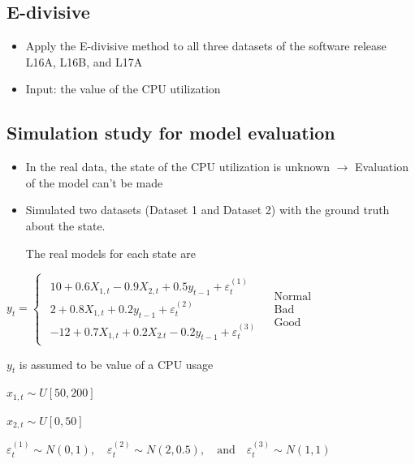 \documentclass{beamer}
\begin{document}
\subsection{E-divisive}
\begin{frame}

\begin{itemize}
\item Apply the E-divisive method to all three datasets of the software release L16A, L16B, and L17A
\item Input: the value of the CPU utilization
\end{itemize}

\end{frame}

\subsection{Simulation study for model evaluation}
\begin{frame}
\begin{itemize}
\item In the real data, the state of the CPU utilization is unknown $\rightarrow$ Evaluation of the model can't be made
\pause

\item Simulated two datasets (Dataset 1 and Dataset 2) with the ground truth about the state. 

The real models for each state are
\end{itemize}

$y_{t}=\begin{cases}
\begin{array}{c}
10+0.6X_{1,t}-0.9X{}_{2,t}+0.5y_{t-1}+\varepsilon_{t}^{(1)}\\
2+0.8X_{1,t}+0.2y_{t-1}+\varepsilon_{t}^{(2)}\\
-12+0.7X_{1,t}+0.2X{}_{2.t}-0.2y_{t-1}+\varepsilon_{t}^{(3)}
\end{array} & \begin{array}{c}
\mathrm{Normal}\\
\mathrm{Bad}\\
\mathrm{Good}
\end{array}\end{cases}$
\vspace{1em}

$y_{t}$ is assumed to be value of a CPU usage

$x_{1,t}\sim U[50,200]$

$x_{2,t}\sim U[0,50]$ 

$\varepsilon_{t}^{(1)}\sim N(0,1),\quad \varepsilon_{t}^{(2)}\sim N(2,0.5),\quad \mathrm{and} \quad \varepsilon_{t}^{(3)}\sim N(1,1)$

\end{frame}
\end{document}
